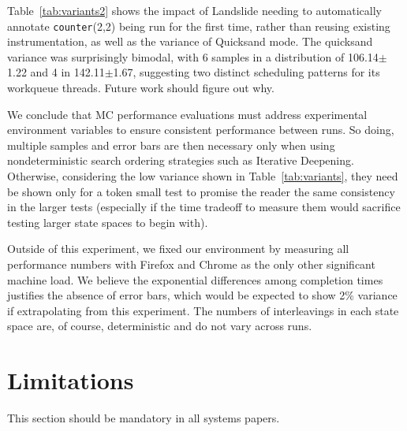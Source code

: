 \documentclass[10pt]{sigplanconf}
\begin{document}
Table~\ref{tab:variants2} shows
the impact of Landslide needing to automatically annotate {\tt counter}(2,2) being run for the first time,
rather than reusing existing instrumentation,
as well as the variance of Quicksand mode. %
The {\sf quicksand} variance was surprisingly bimodal,
with 6 samples in a distribution of 106.14$\pm$1.22 and 4 in 142.11$\pm$1.67,
suggesting two distinct scheduling patterns for its workqueue threads.
Future work should figure out why.

We conclude that MC performance evaluations must address
experimental environment variables
to ensure consistent performance between runs.
So doing, multiple samples and error bars are then necessary
only when using nondeterministic search ordering strategies
such as Iterative Deepening.
Otherwise, considering the low variance shown in Table~\ref{tab:variants},
they need be shown only for a token small test
to promise the reader the same consistency in the larger tests
(especially if the time tradeoff to measure them would sacrifice testing larger state spaces to begin with).

Outside of this experiment, we fixed our environment by measuring all performance numbers
with Firefox and Chrome as the only other significant machine load.
We believe the exponential differences among completion times justifies the absence of error bars,
which would be expected to show 2\% variance if extrapolating from this experiment.
The numbers of interleavings in each state space are, of course, deterministic and do not vary across runs.


\section{Limitations}
\label{sec:warpzone}

This section should be mandatory in all systems papers.
\end{document}
